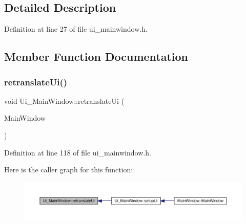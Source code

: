 \subsection{Detailed Description}


Definition at line 27 of file ui\+\_\+mainwindow.\+h.



\subsection{Member Function Documentation}
\mbox{\label{class_ui___main_window_a097dd160c3534a204904cb374412c618}} 
\subsubsection{\texorpdfstring{retranslate\+Ui()}{retranslateUi()}}
{\footnotesize\ttfamily void Ui\+\_\+\+Main\+Window\+::retranslate\+Ui (\begin{DoxyParamCaption}\item[{Q\+Main\+Window $\ast$}]{Main\+Window }\end{DoxyParamCaption})\hspace{0.3cm}{\ttfamily [inline]}}



Definition at line 118 of file ui\+\_\+mainwindow.\+h.

Here is the caller graph for this function\+:
\nopagebreak
\begin{figure}[H]
\begin{center}
\leavevmode
\includegraphics[width=350pt]{class_ui___main_window_a097dd160c3534a204904cb374412c618_icgraph}
\end{center}
\end{figure}
\mbox{\label{class_ui___main_window_acf4a0872c4c77d8f43a2ec66ed849b58}} 
